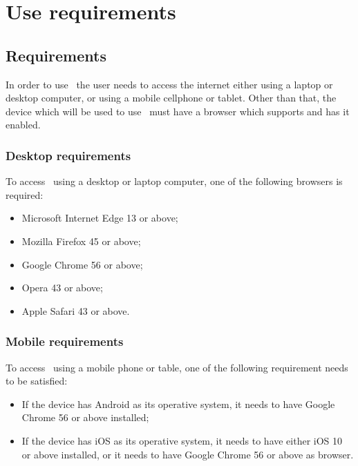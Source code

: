 \section{Use requirements}

\subsection{Requirements}
In order to use \app\ the user needs to access the internet either using a laptop or desktop computer, or using a mobile cellphone or tablet. Other than that, the device which will be used to use \app\ must have a browser which supports  and has it enabled.

\subsubsection{Desktop requirements}
To access \app\ using a desktop or laptop computer, one of the following browsers is required:
\begin{itemize}
	\item Microsoft Internet Edge 13 or above;
	\item Mozilla Firefox 45 or above;
	\item Google Chrome 56 or above;
	\item Opera 43 or above;
	\item Apple Safari 43 or above.
\end{itemize}

\subsubsection{Mobile requirements}
To access \app\ using a mobile phone or table, one of the following requirement needs to be satisfied:
\begin{itemize}
	\item If the device has Android as its operative system, it needs to have Google Chrome 56 or above installed;
	\item If the device has iOS as its operative system, it needs to have either iOS 10 or above installed, or it needs to have Google Chrome 56 or above as browser.
\end{itemize}

